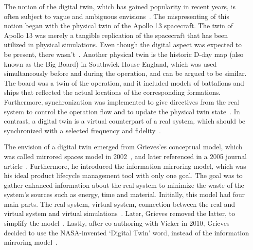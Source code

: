 \documentclass{llncs}
\begin{document}
    The notion of the digital twin, which has gained popularity in 
    recent years, is often subject to vague and ambiguous envisions~\cite{Review1}.
    The mispresenting of this notion began with the physical twin of the Apollo 13 spacecraft. 
    The twin of Apollo 13 was merely a tangible replication of the spacecraft that has been utilized in physical simulations. 
    Even though the digital aspect was expected to be present, there wasn't~\cite{GrievesApollo13}.
    Another physical twin is the historic D-day map (also known as the Big Board) in Southwick House England, 
    which was used simultaneously before and during the operation, and can be argued to be similar. 
    The board was a twin of the operation, and it included models of battalions and ships that reflected the actual 
    locations of the corresponding formations. Furthermore, synchronization was 
    implemented to give directives from the real system to control the operation 
    flow and to update the physical twin state~\cite{AMRC}.
    In contrast, a digital twin is a virtual counterpart of a real system, which should 
    be synchronized with a selected frequency and fidelity~\cite{Review1,Review2,digitaltwinconsortium2022}.
    
    The envision of a digital twin emerged from Grieves'es conceptual model, which was called mirrored spaces model in 2002~\cite{Originsofdigitaltwinconcept},
    and later referenced in a 2005 journal article~\cite{2005JournayArticle}. 
    Furthermore, he introduced the information mirroring model, which was his ideal product lifecycle management tool with only one goal. 
    The goal was to gather enhanced information about the real system to minimize the waste of the system's sources such as energy, 
    time and material. Initially, this model had four main parts. The real system, 
    virtual system, connection between the real and virtual system and virtual simulations~\cite{GrievesPLMBook}. 
    Later, Grieves removed the latter, to simplify the model~\cite{Originsofdigitaltwinconcept}. Lastly, after co-authoring with Vicker in 2010, 
    Grieves decided to use the NASA-invented `Digital Twin' word, instead of the information mirroring model~\cite{Originsofdigitaltwinconcept}.
     
\end{document}
